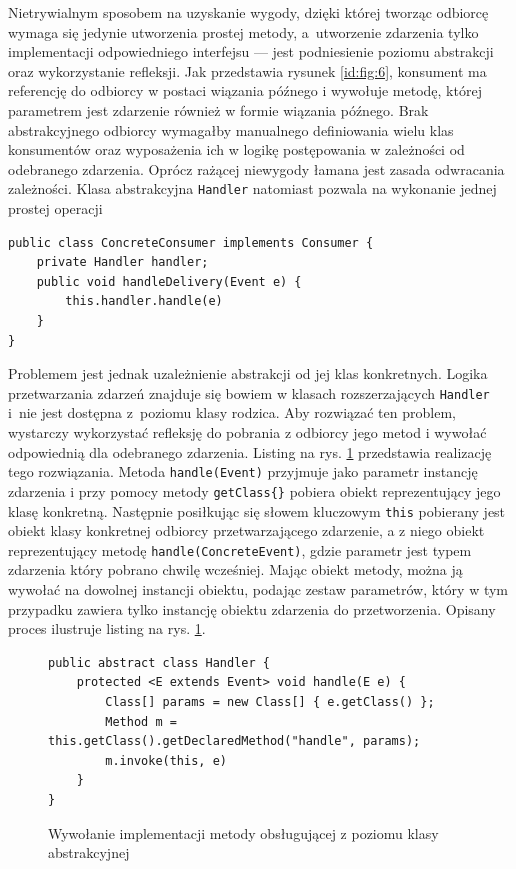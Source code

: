 \documentclass[a4paper]{book}
\begin{document}
{Nietrywialnym sposobem na uzyskanie wygody, dzięki której tworząc odbiorcę wymaga się jedynie utworzenia prostej metody, a~utworzenie zdarzenia tylko implementacji odpowiedniego interfejsu --- jest podniesienie poziomu abstrakcji oraz wykorzystanie refleksji. Jak przedstawia rysunek \ref{id:fig:6}, konsument ma referencję do odbiorcy w postaci wiązania późnego i wywołuje metodę, której parametrem jest zdarzenie również w formie wiązania późnego. Brak abstrakcyjnego odbiorcy wymagałby manualnego definiowania wielu klas konsumentów oraz wyposażenia ich w logikę postępowania w zależności od odebranego zdarzenia. Oprócz rażącej niewygody łamana jest zasada odwracania zależności. Klasa abstrakcyjna \lstinline|Handler| natomiast pozwala na wykonanie jednej prostej operacji
\begin{lstlisting}
public class ConcreteConsumer implements Consumer {
	private Handler handler;
	public void handleDelivery(Event e) {
		this.handler.handle(e)
	}
}
\end{lstlisting}
Problemem jest jednak uzależnienie abstrakcji od jej klas konkretnych. Logika przetwarzania zdarzeń znajduje się bowiem w klasach rozszerzających \lstinline|Handler| i~nie jest dostępna z~poziomu klasy rodzica. Aby rozwiązać ten problem, wystarczy wykorzystać refleksję do pobrania z odbiorcy jego metod i wywołać odpowiednią dla odebranego zdarzenia. Listing na rys. \ref{id:fig:listing:RabbitAbstractHandlerUsage} przedstawia realizację tego rozwiązania. Metoda \lstinline|handle(Event)| przyjmuje jako parametr instancję zdarzenia i przy pomocy metody \lstinline|getClass{}| pobiera obiekt reprezentujący jego klasę konkretną. Następnie posiłkując się słowem kluczowym \lstinline|this| pobierany jest obiekt klasy konkretnej odbiorcy przetwarzającego zdarzenie, a z niego obiekt reprezentujący metodę \lstinline|handle(ConcreteEvent)|, gdzie parametr jest typem zdarzenia który pobrano chwilę wcześniej. Mając obiekt metody, można ją wywołać na dowolnej instancji obiektu, podając zestaw parametrów, który w tym przypadku zawiera tylko instancję obiektu zdarzenia do przetworzenia. Opisany proces ilustruje listing na rys. \ref{id:fig:listing:RabbitAbstractHandlerUsage}.
\begin{figure}
	\begin{lstlisting}
public abstract class Handler {
	protected <E extends Event> void handle(E e) {
		Class[] params = new Class[] { e.getClass() };
		Method m = this.getClass().getDeclaredMethod("handle", params);	
		m.invoke(this, e)
	}
}
	\end{lstlisting}
	\caption{Wywołanie implementacji metody obsługującej z poziomu klasy abstrakcyjnej}
	\label{id:fig:listing:RabbitAbstractHandlerUsage}
\end{figure}

}
\end{document}
